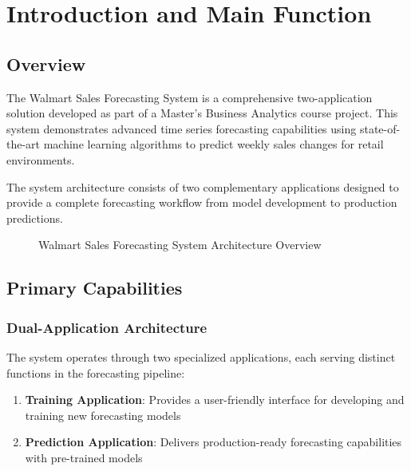 %
%
%



\chapter{Introduction and Main Function}

\section{Overview}

The Walmart Sales Forecasting System is a comprehensive two-application solution developed as part of a Master's Business Analytics course project. This system demonstrates advanced time series forecasting capabilities using state-of-the-art machine learning algorithms to predict weekly sales changes for retail environments.

The system architecture consists of two complementary applications designed to provide a complete forecasting workflow from model development to production predictions.

\begin{figure}[H]
    \centering
    
    \caption{Walmart Sales Forecasting System Architecture Overview}
    \label{fig:system_architecture}
\end{figure}

\section{Primary Capabilities}

\subsection{Dual-Application Architecture}

The system operates through two specialized applications, each serving distinct functions in the forecasting pipeline:

\begin{enumerate}
    \item \textbf{Training Application}: Provides a user-friendly interface for developing and training new forecasting models
    \item \textbf{Prediction Application}: Delivers production-ready forecasting capabilities with pre-trained models
\end{enumerate}

